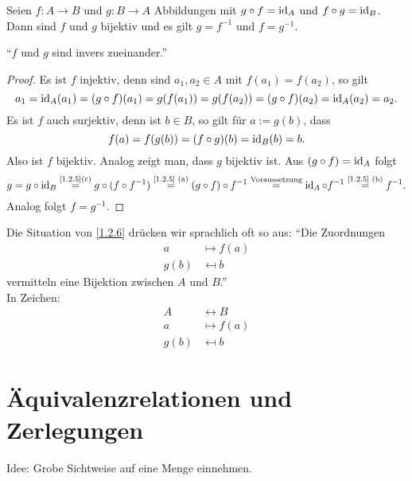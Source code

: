 \documentclass[../../main.tex]{subfiles}
\begin{document}
\begin{sat}\label{1.2.6}
Seien $f:A\rightarrow B$ und $g:B\rightarrow A$ Abbildungen mit $g\circ f=\operatorname{id}_A$ und $f\circ g=\operatorname{id}_B$. Dann sind $f$ und $g$ bijektiv und es gilt $g=f^{-1}$ und $f=g^{-1}$.\vspace{-1em}
\begin{flushright}
\small
"`$f$ und $g$ sind invers zueinander."'
\end{flushright}
\end{sat}
\begin{proof}
Es ist $f$ injektiv, denn sind $a_1,a_2\in A$ mit $f(a_1)=f(a_2)$, so gilt
$$a_1=\operatorname{id}_A(a_1)=(g\circ f)(a_1)= g(f(a_1))= g(f(a_2)) = (g\circ f)(a_2) = \operatorname{id}_A(a_2) = a_2.$$
Es ist $f$ auch surjektiv, denn ist $b\in B$, so gilt für $a:=g(b)$, dass
$$f(a)=f(g(b))= (f\circ g)(b)=\operatorname{id}_B(b) = b.$$
Also ist $f$ bijektiv.
Analog zeigt man, dass $g$ bijektiv ist. Aus $(g\circ f)=\operatorname{id}_A$ folgt 
$$g=g\circ \operatorname{id}_B\overset {\text{\ref{1.2.5}(c)}} =g\circ (f\circ f^{-1})\overset {\text{\ref{1.2.5} (a)}}=(g\circ f)\circ f^{-1}\overset {\text{Voraussetzung}}= \operatorname{id}_A \circ f^{-1} \overset{\text{\ref{1.2.5} (b)}}=f^{-1}.$$
Analog folgt $f=g^{-1}$.
\end{proof}

\begin{sprnt}\label{1.2.7}
Die Situation von \ref{1.2.6} drücken wir sprachlich oft so aus:
"`Die Zuordnungen
\begin{align*}
a & \mapsto f(a)\\
g(b) & \mapsfrom b
\end{align*}
vermitteln eine Bijektion zwischen $A$ und $B$."'\\
In Zeichen:
\begin{align*}
A&\leftrightarrow B\\
a&\mapsto f(a)\\
g(b)&\mapsfrom b
\end{align*}
\end{sprnt}

\section{Äquivalenzrelationen und Zerlegungen}\label{1.3}

\noindent
Idee: Grobe Sichtweise auf eine Menge einnehmen.
\end{document}
